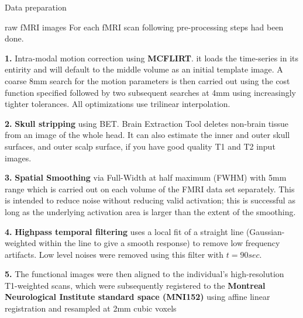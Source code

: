 \documentclass[a4paper,fleqn]{cas-dc}
\newcommand{\algorithmicinput}{\textbf{input}}
\newcommand{\INPUT}{\item[\algorithmicinput]}
\begin{document}
\begin{algorithm*}
	\caption{Data preparation}
	\label{alg:preprocessing}
	\begin{algorithmic}
		\INPUT{raw fMRI images}
		\STATE 
		\STATE For each fMRI scan following pre-processing steps had been done.
		\STATE 
		
		\item{\textbf{1.}} Intra-modal motion correction using \textbf{MCFLIRT}. it loads the time-series in its entirity and will default to the middle volume as an initial template image. A coarse 8mm search for the motion parameters is then carried out using the cost function specified followed by two subsequent searches at 4mm using increasingly tighter tolerances. All optimizations use trilinear interpolation.
		\STATE 
		
		\item{\textbf{2.}} \textbf{Skull stripping} using BET. Brain Extraction Tool deletes non-brain tissue from an image of the whole head. It can also estimate the inner and outer skull surfaces, and outer scalp surface, if you have good quality T1 and T2 input images.
		\STATE 
		
		\item{\textbf{3.}} \textbf{Spatial Smoothing} via Full-Width at half maximum (FWHM) with 5mm range which is carried out on each volume of the FMRI data set separately. This is intended to reduce noise without reducing valid activation; this is successful as long as the underlying activation area is larger than the extent of the smoothing.
		\STATE 
		
		\item{\textbf{4.}} \textbf{Highpass temporal filtering} uses a local fit of a straight line (Gaussian-weighted within the line to give a smooth response) to remove low frequency artifacts. Low level noises were removed using this filter with $t = 90 sec$.
		\STATE 
		
		\item{\textbf{5.}} The functional images were then aligned to the individual's high-resolution T1-weighted scans, which were subsequently registered to the \textbf{Montreal Neurological Institute standard space (MNI152)} using affine linear registration and resampled at 2mm cubic voxels
		\STATE 

	\end{algorithmic}
\end{algorithm*}
\end{document}
